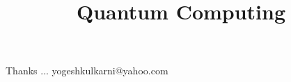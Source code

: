 \documentclass[xcolor=dvipsnames,compress,t,pdf,9pt]{beamer}
\title[\insertframenumber /\inserttotalframenumber]{Quantum Computing}
\begin{document}
	\begin{frame}
	\titlepage
	\end{frame}
	
	

	\begin{frame}[c]{}
	Thanks ...
	\vspace{5mm}
	yogeshkulkarni@yahoo.com
	\end{frame}
\end{document}
